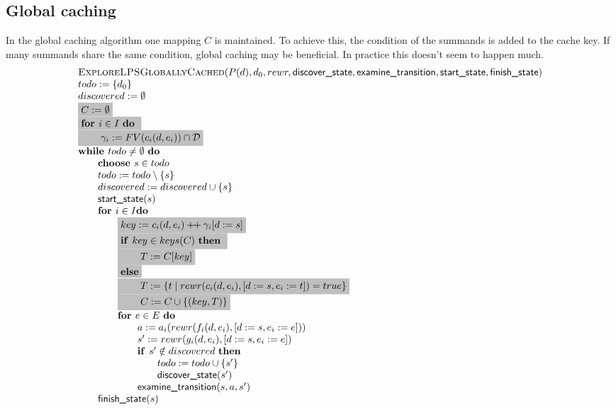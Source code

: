 \documentclass{article}
\newcommand{\concat}{\ensuremath{+\!\!+\:}}
\newcommand{\Space}{\text{\ }}
\newcommand{\If}{\text{\textbf{if }}}
\newcommand{\Do}{\text{\textbf{do }}}
\newcommand{\Then}{\text{\textbf{then }}}
\newcommand{\For}{\text{\textbf{for }}}
\newcommand{\While}{\text{\textbf{while }}}
\newcommand{\Choose}{\text{\textbf{choose }}}
\begin{document}
\subsection{Global caching}
In the global caching algorithm one mapping $C$ is maintained. To achieve this, the condition of the summands is added to the cache key. If many summands share the same condition, global caching may be beneficial. In practice this doesn't seem to happen much.
\[
\begin{tabular}{l}
\textsc{ExploreLPSGloballyCached}($P(d), d_0, rewr, \textsf{discover\_state}, \textsf{examine\_transition},
\textsf{start\_state}, \textsf{finish\_state})$ \\
$todo := \{d_0\}$ \\
$discovered := \emptyset$ \\
\colorbox{lightgray}{$C := \emptyset$} \\
\colorbox{lightgray}{\For $i \in I$ \Do} \\
\colorbox{lightgray}{\qquad $\gamma_i := FV(c_i(d, e_i)) \cap \mathcal{D}$} \\
$\While todo \neq \emptyset \Space \Do$ \\
\qquad $\Choose s \in todo$ \\
\qquad $todo := todo \setminus \{s\}$ \\
\qquad $discovered := discovered \cup \{s\}$ \\
\qquad $\textsf{start\_state}(s)$ \\
\qquad $\For i \in I \Do$ \\
\qquad \qquad \colorbox{lightgray}{$key := c_i(d,e_i) \concat \gamma_i[d:=s]$} \\
\qquad \qquad \colorbox{lightgray}{\If $key \in keys(C)$ \Then} \\
\qquad \qquad \colorbox{lightgray}{\qquad $T := C[key]$} \\
\qquad \qquad \colorbox{lightgray}{\textbf{else}} \\
\qquad \qquad \colorbox{lightgray}{\qquad $T := \{ t \mid rewr(c_i(d, e_i), [d:=s,e_i:=t]) = true \}$} \\
\qquad \qquad \colorbox{lightgray}{\qquad $C := C \cup \{(key, T)\}$} \\
\qquad \qquad $\For e \in E  \Space \Do$ \\
\qquad \qquad \qquad $a := a_i(rewr(f_i(d,e_i), [d:=s,e_i:=e]))$ \\
\qquad \qquad \qquad $s' := rewr(g_i(d,e_i), [d:=s,e_i:=e])$ \\
\qquad \qquad \qquad $\If s' \notin discovered \Space \Then$ \\
\qquad \qquad \qquad \qquad $todo := todo \cup \{ s' \}$ \\
\qquad \qquad \qquad \qquad $\textsf{discover\_state}(s')$ \\
\qquad \qquad \qquad $\textsf{examine\_transition}(s, a, s')$ \\
\qquad $\textsf{finish\_state}(s)$
\end{tabular}
\]
\end{document}
